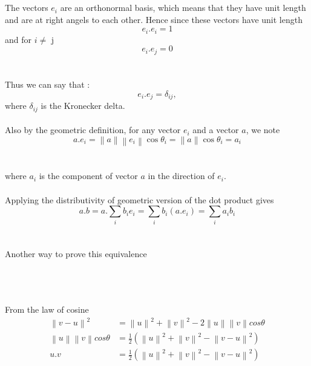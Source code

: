 \documentclass[a4paper, 12pt]{article}
\newcommand{\norm}[1]{\left\lVert#1\right\rVert}
\begin{document}
\\
\\
The vectors $e_i$ are an orthonormal basis, which means that they have unit length and are at
right angels to each other. Hence since these vectors have unit length
\[
e_i.e_i = 1
\]
and for $i \ne $ j
\[
e_i.e_j = 0
\]
\\
\\
Thus we can say that :
\[
e_i.e_j = \delta_{ij},
\]
where $\delta_{ij}$ is the Kronecker delta.
\\
\\
Also by the geometric definition, for any vector $e_i$ and a vector $a$, we note
\[
a.e_i = \norm{a}  \norm{e_i} \cos \theta_i = \norm{a} \cos \theta_i = a_i
\]
\\
\\
where $a_i$ is the component of vector $a$ in the direction of $e_i$.  
\\
\\
Applying the distributivity of geometric version of the dot product gives
\[
a.b = a.\sum \limits_{i} b_ie_i = \sum \limits_{i} b_i(a.e_i) = \sum \limits_{i} a_i b_i
\]
\\
\\
Another way to prove this equivalence
\\
\\
\\
\\
From the law of cosine
\begin{align*}
\norm{v - u}^2 &= \norm{u}^2 + \norm{v}^2 - 2\norm{u}\norm{v}cos\theta\\
\norm{u}\norm{v}cos\theta &= \frac{1}{2}\left({\norm{u}^2 + \norm{v}^2 - \norm{v - u}^2 }\right)\\
u.v &= \frac{1}{2}\left({\norm{u}^2 + \norm{v}^2 - \norm{v - u}^2 }\right)\\
\end{align*} 
\end{document}
